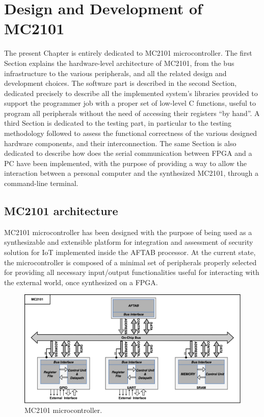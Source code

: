 \chapter{Design and Development of MC2101}
The present Chapter is entirely dedicated to MC2101 microcontroller. The first Section explains the hardware-level architecture of MC2101, from the bus infrastructure to the various peripherals, and all the related design and development choices. The software part is described in the second Section, dedicated precisely to describe all the implemented system's libraries provided to support the programmer job with a proper set of low-level C functions, useful to program all peripherals without the need of accessing their registers ``by hand''. A third Section is dedicated to the testing part, in particular to the testing methodology followed to assess the functional correctness of the various designed hardware components, and their interconnection. The same Section is also dedicated to describe how does the serial communication between FPGA and a PC have been implemented, with the purpose of providing a way to allow the interaction between a personal computer and the synthesized MC2101, through a command-line terminal.

\section{MC2101 architecture}
MC2101 microcontroller has been designed with the purpose of being used as a synthesizable and extensible platform for integration and assessment of security solution for IoT implemented inside the AFTAB processor. At the current state, the microcontroller is composed of a minimal set of peripherals properly selected for providing all necessary input/output functionalities useful for interacting with the external world, once synthesized on a FPGA.

\begin{figure}[h]
\vspace{0.5cm}
\includegraphics[width=\textwidth]{./images/MC2101}
\caption{MC2101 microcontroller.}
\label{fig:mc2101} %
\end{figure}

